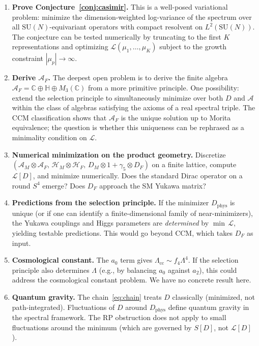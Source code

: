 \documentclass[12pt]{article}
\theoremstyle{definition}
\theoremstyle{remark}
\newcommand{\SU}{\mathrm{SU}}
\begin{document}
\begin{enumerate}
\item \textbf{Prove Conjecture~\ref{conj:casimir}.}
  This is a well-posed variational problem: minimize the
  dimension-weighted log-variance of the spectrum over all
  $\SU(N)$-equivariant operators with compact resolvent on
  $L^2(\SU(N))$.  The conjecture can be tested numerically by
  truncating to the first $K$ representations and optimizing
  $\mathcal{L}(\mu_1,\ldots,\mu_K)$ subject to the growth constraint
  $|\mu_p| \to \infty$.

\item \textbf{Derive $\mathcal{A}_F$.}
  The deepest open problem is to derive the finite algebra
  $\mathcal{A}_F = \mathbb{C} \oplus \mathbb{H} \oplus M_3(\mathbb{C})$
  from a more primitive principle.  One possibility: extend the selection
  principle to simultaneously minimize over both $D$ and $\mathcal{A}$
  within the class of algebras satisfying the axioms of a real spectral
  triple.  The CCM classification
  \cite{CCM2007} shows that $\mathcal{A}_F$ is the unique solution
  up to Morita equivalence; the question is whether this uniqueness
  can be rephrased as a minimality condition on $\mathcal{L}$.

\item \textbf{Numerical minimization on the product geometry.}
  Discretize $(\mathcal{A}_M \otimes \mathcal{A}_F,\,
  \mathcal{H}_M \otimes \mathcal{H}_F,\,
  D_M \otimes 1 + \gamma_5 \otimes D_F)$ on a finite lattice,
  compute $\mathcal{L}[D]$, and minimize numerically.
  Does the standard Dirac operator on a round $S^4$ emerge?
  Does $D_F$ approach the SM Yukawa matrix?

\item \textbf{Predictions from the selection principle.}
  If the minimizer $D_{\mathrm{phys}}$ is unique (or if one can
  identify a finite-dimensional family of near-minimizers),
  the Yukawa couplings and Higgs parameters are \emph{determined}
  by $\min\,\mathcal{L}$, yielding testable predictions.
  This would go beyond CCM, which takes $D_F$ as input.

\item \textbf{Cosmological constant.}
  The $a_0$ term gives $\Lambda_{\mathrm{cc}} \sim f_4\Lambda^4$.
  If the selection principle also determines $\Lambda$ (e.g., by
  balancing $a_0$ against $a_2$), this could address the cosmological
  constant problem.  We have no concrete result here.

\item \textbf{Quantum gravity.}
  The chain~\eqref{eq:chain} treats $D$ classically (minimized, not
  path-integrated).  Fluctuations of $D$ around $D_{\mathrm{phys}}$
  define quantum gravity in the spectral framework.  The RP obstruction
  does not apply to small fluctuations around the minimum (which are
  governed by $S[D]$, not $\mathcal{L}[D]$).
\end{enumerate}
\end{document}

